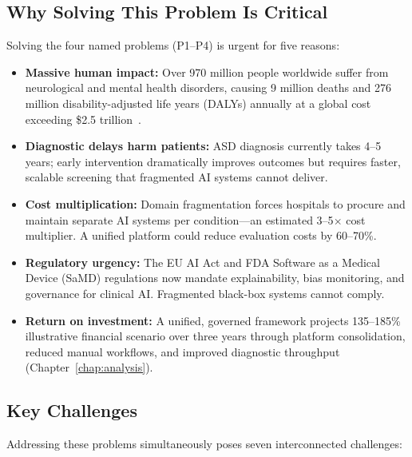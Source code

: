 \subsection{Why Solving This Problem Is Critical}
\label{sec:why_critical}

Solving the four named problems (P1--P4) is urgent for five reasons:

\begin{itemize}[leftmargin=*, itemsep=3pt]
    \item \textbf{Massive human impact:} Over 970 million people worldwide suffer from neurological and mental health disorders, causing 9 million deaths and 276 million disability-adjusted life years (DALYs) annually at a global cost exceeding \$2.5 trillion~\cite{who2024neuro}.
    \item \textbf{Diagnostic delays harm patients:} ASD diagnosis currently takes 4--5 years; early intervention dramatically improves outcomes but requires faster, scalable screening that fragmented AI systems cannot deliver.
    \item \textbf{Cost multiplication:} Domain fragmentation forces hospitals to procure and maintain separate AI systems per condition---an estimated 3--5$\times$ cost multiplier. A unified platform could reduce evaluation costs by 60--70\%.
    \item \textbf{Regulatory urgency:} The EU AI Act and FDA Software as a Medical Device (SaMD) regulations now mandate explainability, bias monitoring, and governance for clinical AI. Fragmented black-box systems cannot comply.
    \item \textbf{Return on investment:} A unified, governed framework projects 135--185\% illustrative financial scenario over three years through platform consolidation, reduced manual workflows, and improved diagnostic throughput (Chapter~\ref{chap:analysis}).
\end{itemize}

\subsection{Key Challenges}
\label{sec:key_challenges}

Addressing these problems simultaneously poses seven interconnected challenges:

